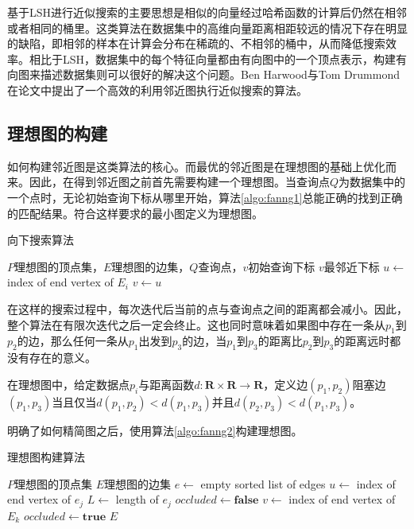 基于LSH进行近似搜索的主要思想是相似的向量经过哈希函数的计算后仍然在相邻或者相同的桶里。这类算法在数据集中的高维向量距离相距较远的情况下存在明显的缺陷，即相邻的样本在计算会分布在稀疏的、不相邻的桶中，从而降低搜索效率。相比于LSH，数据集中的每个特征向量都由有向图中的一个顶点表示，构建有向图来描述数据集则可以很好的解决这个问题。Ben Harwood与Tom Drummond在论文\parencite{harwood2016fanng}中提出了一个高效的利用邻近图执行近似搜索的算法。

\subsection{理想图的构建}

如何构建邻近图是这类算法的核心。而最优的邻近图是在理想图的基础上优化而来。因此，在得到邻近图之前首先需要构建一个理想图。当查询点$Q$为数据集中的一个点时，无论初始查询下标从哪里开始，算法\ref{algo:fanng1}\cite{harwood2016fanng}总能正确的找到正确的匹配结果。符合这样要求的最小图定义为理想图。

\begin{algorithm}
	\caption{向下搜索算法}
	\label{algo:fanng1}
	\begin{algorithmic}[1] %
		\Require $P$理想图的顶点集，$E$理想图的边集，$Q$查询点，$v$初始查询下标 %
		\Ensure $v$最邻近下标 %
		\State $u\leftarrow$ index of end vertex of $E_i$
		\State $v\leftarrow u$
		\EndIf
		\EndFor
	\end{algorithmic}
\end{algorithm}

在这样的搜索过程中，每次迭代后当前的点与查询点之间的距离都会减小。因此，整个算法在有限次迭代之后一定会终止。这也同时意味着如果图中存在一条从$p_1$到$p_2$的边，那么任何一条从$p_1$出发到$p_3$的边，当$p_1$到$p_3$的距离比$p_2$到$p_3$的距离远时都没有存在的意义。

在理想图中，给定数据点$p_i$与距离函数$d:\mathbf{R}\times \mathbf{R} \rightarrow \mathbf{R}$，定义边$(p_1,p_2)$阻塞边$(p_1,p_3)$当且仅当$d(p_1,p_2)<d(p_1,p_3)$并且$d(p_2,p_3)<d(p_1,p_3)$。

明确了如何精简图之后，使用算法\ref{algo:fanng2}\cite{harwood2016fanng}构建理想图。

\begin{algorithm}
	\caption{理想图构建算法}
	\label{algo:fanng2}
	\begin{algorithmic}[1] %
		\Require $P$理想图的顶点集
		\Ensure $E$理想图的边集 %
		\State $e\leftarrow$ empty sorted list of edges
		\State $u \leftarrow$ index of end vertex of $e_j$
		\State $L \leftarrow$ length of $e_j$
		\State $occluded \leftarrow \mathbf{false}$
		\State $v \leftarrow$ index of end vertex of $E_k$
		\State $occluded \leftarrow \mathbf{true}$
		\EndIf
		\EndFor
		\EndFor
		\EndFor
		\Return $E$
	\end{algorithmic}
\end{algorithm}

